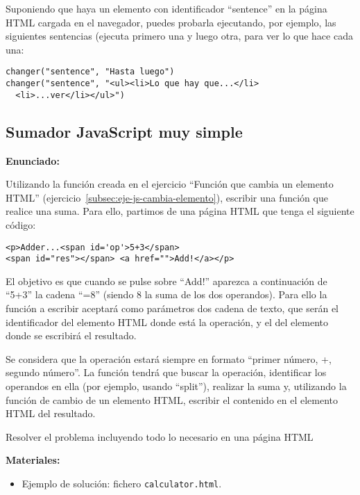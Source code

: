 Suponiendo que haya un elemento con identificador ``sentence'' en la página HTML cargada en el navegador, puedes probarla ejecutando, por ejemplo, las siguientes sentencias (ejecuta primero una y luego otra, para ver lo que hace cada una:

\begin{verbatim}
changer("sentence", "Hasta luego")
changer("sentence", "<ul><li>Lo que hay que...</li>
  <li>...ver</li></ul>")
\end{verbatim}

\subsection{Sumador JavaScript muy simple}
\label{subsec:eje-js-sumador-muy-simple}


\textbf{Enunciado:}

Utilizando la función creada en el ejercicio ``Función que cambia un elemento HTML'' (ejercicio~\ref{subsec:eje-js-cambia-elemento}), escribir una función que realice una suma. Para ello, partimos de una página HTML que tenga el siguiente código:

\begin{verbatim}
<p>Adder...<span id='op'>5+3</span>
<span id="res"></span> <a href="">Add!</a></p>
\end{verbatim}

El objetivo es que cuando se pulse sobre ``Add!'' aparezca a continuación de ``5+3'' la cadena ``=8'' (siendo 8 la suma de los dos operandos). Para ello la función a escribir aceptará como parámetros dos cadena de texto, que serán el identificador del elemento HTML donde está la operación, y el del elemento donde se escribirá el resultado.

Se considera que la operación estará siempre en formato ``primer número, +, segundo número''. La función tendrá que buscar la operación, identificar los operandos en ella (por ejemplo, usando ``split''), realizar la suma y, utilizando la función de cambio de un elemento HTML, escribir el contenido en el elemento HTML del resultado.

Resolver el problema incluyendo todo lo necesario en una página HTML

\textbf{Materiales:}

\begin{itemize}
\item Ejemplo de solución: fichero \verb|calculator.html|.
\end{itemize}


